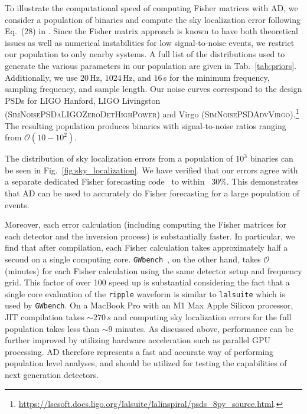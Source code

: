 \documentclass[twocolumn]{aastex631}
\newcommand{\ripple}{\texttt{ripple}\xspace}
\newcommand{\lalsuite}{\texttt{lalsuite}\xspace}
\begin{document}
To illustrate the computational speed of computing Fisher matrices with AD, we consider a population of binaries and compute the sky localization error following Eq.~(28) in \cite{Iacovelli:2022bbs, Iacovelli:2022mbg}.
Since the Fisher matrix approach is known to have both theoretical issues as well as numerical instabilities for low signal-to-noise events, we restrict our population to only nearby systems.
A full list of the distributions used to generate the various parameters in our population are given in Tab.~\ref{tab:priors}. 
Additionally, we use $20\,$Hz, $1024\,$Hz, and $16\,$s for the minimum frequency, sampling frequency, and sample length.
Our noise curves correspond to the design PSDs for LIGO Hanford, LIGO Livingston (\textsc{SimNoisePSDaLIGOZeroDetHighPower}) and Virgo (\textsc{SimNoisePSDAdvVirgo}).\footnote{\url{https://lscsoft.docs.ligo.org/lalsuite/lalinspiral/psds_8py_source.html}.}
The resulting population produces binaries with signal-to-noise ratios ranging from $\mathcal{O}(10-10^2)$.

The distribution of sky localization errors from a population of $10^3$ binaries can be seen in Fig.~\ref{fig:sky_localization}.
We have verified that our errors agree with a separate dedicated Fisher forecasting code~\citep{Borhanian:2020ypi} to within ~30\%.
This demonstrates that AD can be used to accurately do Fisher forecasting for a large population of events.

Moreover, each error calculation (including computing the Fisher matrices for each detector and the inversion process) is substantially faster.
In particular, we find that after compilation, each Fisher calculation takes approximately half a second on a single computing core.
\texttt{GWbench}~\citep{Borhanian:2020ypi}, on the other hand, takes $\mathcal{O}$(minutes) for each Fisher calculation using the same detector setup and frequency grid.
This factor of over 100 speed up is substantial considering the fact that a single core evaluation of the \ripple waveform is similar to \lalsuite which is used by \texttt{GWbench}.
On a MacBook Pro with an M1 Max Apple Silicon processor, JIT compilation takes $\sim 270\,s$ and computing sky localization errors for the full population takes less than $\sim 9$ minutes.
As discussed above, performance can be further improved by utilizing hardware acceleration such as parallel GPU processing.
AD therefore represents a fast and accurate way of performing population level analyses, and should be utilized for testing the capabilities of next generation detectors.
\end{document}
